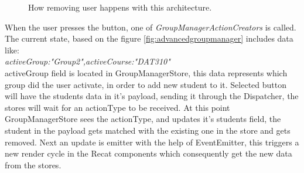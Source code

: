 \begin{figure}[h]
  \scalebox{0.8}{}
  \caption{How removing user happens with this architecture.}
  \label{fig:advancedfluxaddstudent}
\end{figure}

When the user presses the button, one of \emph{GroupManagerActionCreators} is called. The current state, based on the figure \ref{fig:advancedgroupmanager} includes data like:
\\\emph{activeGroup:"Group2",activeCourse:"DAT310" }
\\activeGroup field is located in GroupManagerStore, this data represents which group did the user activate, in order to add new student to it. Selected button will have the students data in it's payload, sending it through the Dispatcher, the stores will wait for an actionType to be received. At this point GroupManagerStore sees the actionType, and updates it's students field, the student in the payload gets matched with the existing one in the store and gets removed. Next an update is emitter with the help of EventEmitter, this triggers a new render cycle in the Recat components which consequently get the new data from the stores.
